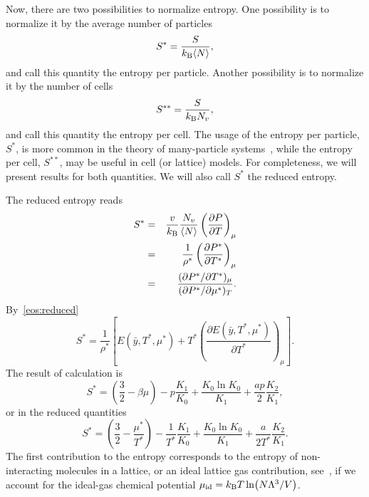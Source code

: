 \documentclass[12pt]{article}
\numberwithin{equation}{section}
\begin{document}
	Now, there are two possibilities to normalize entropy. One possibility is to normalize it by the average number of particles
	\begin{equation}
		S^{*} = \frac{S}{k_{\rm B} \langle N \rangle},
	\end{equation}
	and call this quantity the entropy per particle. Another possibility is to normalize it by the number of cells
	\begin{equation}
		S^{**} = \frac{S}{k_{\rm B}N_v},
	\end{equation}
	and call this quantity the entropy per cell. The usage of the entropy per particle, $S^*$, is more common in the theory of many-particle systems~\cite{HansenMcDonald13}, while the entropy per cell, $S^{**}$, may be useful in cell (or lattice) models. For completeness, we will present results for both quantities. We will also call $S^*$ the reduced entropy.
	
	
	The reduced entropy reads
	\begin{eqnarray}
		S^* & = & \frac{v}{k_{\rm B}} \frac{N_v}{\langle N \rangle} \left(\frac{\partial P}{\partial T}\right)_{\mu}
		\\
		& = & \frac{1}{\rho^*}\left(\frac{\partial P^*}{\partial T^*}\right)_{\mu}
		\\
		& = & \frac{(\partial P^* / \partial T^*)_{\mu}}{(\partial P^* / \partial \mu^*)_T}.
	\end{eqnarray}
	By~\eqref{eos:reduced}
	\begin{equation}
		\label{eq:entropy}
		S^* = \frac{1}{\rho^*} 
		\left[ 
		E(\bar{y},T^*,\mu^*) + T^* \left(\frac{\partial E(\bar{y},T^*,\mu^*)}{\partial T^*}\right)_{\mu} 
		\right].
	\end{equation}
	The result of calculation is
	\begin{equation}
		S^* = \left(\frac{3}{2} - \beta\mu\right) -p \frac{K_1}{K_0} + \frac{K_0 \ln K_0}{K_1} + \frac{ap}{2} \frac{K_2}{K_1},
	\end{equation}
	or in the reduced quantities
	\begin{equation}
		\label{S_vs_T_mu}
		S^* = \left(\frac{3}{2} - \frac{\mu^*}{T^*}\right) - \frac{1}{T^*}\frac{K_1}{K_0} + \frac{K_0 \ln K_0}{K_1} + \frac{a}{2T^*} \frac{K_2}{K_1}.
	\end{equation}
	The first contribution to the entropy corresponds to the entropy of non-interacting molecules in a lattice, or an ideal lattice gas contribution, see~\cite[(47.4)]{Hill56}, if we account for the ideal-gas chemical potential $\mu_{\rm id} = k_{\rm B}T \ln(N\Lambda^3/V)$. 
	
\end{document}
